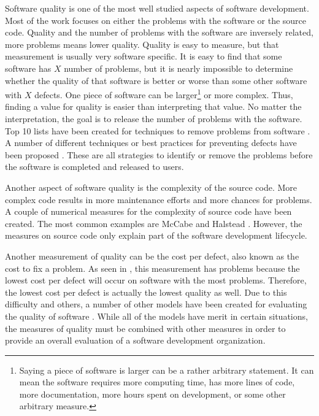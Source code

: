 \documentclass[SDSUThesis.tex]{subfiles}
\begin{document}
    Software quality is one of the most well studied aspects
    of software development.  Most of the work focuses on
    either the problems with the software or the source code.
    Quality and the number of problems with the software
    are inversely related, more problems means lower quality. 
    Quality is easy to measure, but 
    that measurement is usually very software specific.  It is easy
    to find that some software has $X$ number of problems, but
    it is nearly impossible to determine whether the quality
    of that software is better or worse than some other software
    with $X$ defects.  One piece of software can be 
    larger\footnote{Saying a piece of software is larger can be a 
    rather arbitrary statement.  It can mean the software requires 
    more computing time, has more lines of code, more documentation, 
    more hours spent on development, or some other arbitrary measure.}
    or more complex.  Thus, finding a value for quality is easier 
    than interpreting that value.  No matter the interpretation,
    the goal is to release the number of problems with the software.
    Top 10 lists have been created for techniques to remove problems
    from software \cite{Boehm2001}.  
    A number of different techniques or best practices
    for preventing defects have 
    been proposed \cite{Faizan2012}.  These are all strategies to identify
    or remove the problems before the software is completed and released
    to users.  
    
    Another aspect of software quality is the complexity of the 
    source code.  More complex code results in more maintenance efforts and
    more chances for problems. A couple of numerical measures for the 
    complexity of source code have been created.  The most common examples
    are McCabe \cite{McCabe1976} and Halstead \cite{Halstead1977}.
    However, the measures on source code only explain part of the 
    software development lifecycle.  
    
    Another measurement of quality can be the cost per defect, also 
    known as the cost to fix a problem.  As seen in \cite{Jones2013},
    this measurement has problems because the lowest cost per
    defect will occur on software with the most problems.  Therefore,
    the lowest cost per defect is actually the lowest quality as well.
    Due to this difficulty and others, a number of other models
    have been created for evaluating the quality of software 
    \cite{Miguel2014}.  While all of the models have merit
    in certain situations, the measures of quality must be combined
    with other measures in order to provide an overall evaluation
    of a software development organization.
    
\end{document}
